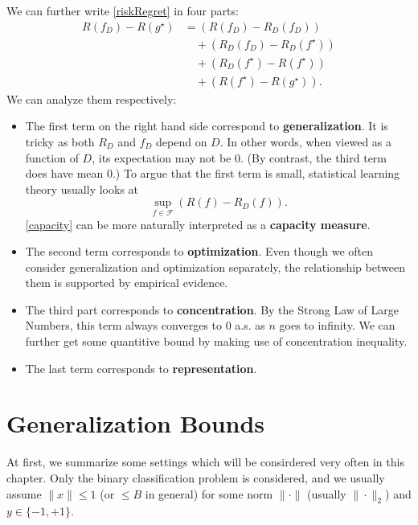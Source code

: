 \documentclass[openany]{book}
\theoremstyle{definition}
\theoremstyle{remark}
\begin{document}
We can further write \eqref{riskRegret} in four parts:
\begin{equation}\label{fullRiskBound}
    \begin{split}
        R(f_{D})-R(g^{\star}) & =\left(R(f_{D})-R_{D}(f_{D})\right) \\
         & \quad+\left(R_{D}(f_{D})-R_{D}(f^{\star})\right) \\
         & \quad+\left(R_{D}(f^{\star})-R(f^{\star})\right) \\
         & \quad+\left(R(f^{\star})-R(g^{\star})\right).
    \end{split}
\end{equation}
We can analyze them respectively:
\begin{itemize}
    \item The first term on the right hand side correspond to \textbf{generalization}. It is tricky as both $R_{D}$ and $f_{D}$ depend on $D$. In other words, when viewed as a function of $D$, its expectation may not be $0$. (By contrast, the third term does have mean 0.) To argue that the first term is small, statistical learning theory usually looks at
    \begin{equation}\label{capacity}
        \sup_{f\in \mathcal{F}}\left(R(f)-R_D(f)\right).
    \end{equation}
    \eqref{capacity} can be more naturally interpreted as a \textbf{capacity measure}.

    \item The second term corresponds to \textbf{optimization}. Even though we often consider generalization and optimization separately, the relationship between them is supported by empirical evidence.

    \item The third part corresponds to \textbf{concentration}. By the Strong Law of Large Numbers, this term always converges to $0$ a.s. as $n$ goes to infinity. We can further get some quantitive bound by making use of concentration inequality.

    \item The last term corresponds to \textbf{representation}.
\end{itemize}

\chapter{Generalization Bounds}
At first, we summarize some settings which will be consirdered very often in this chapter. Only the binary classification problem is considered, and we usually assume $\|x\|\le1$ (or $\le B$ in general) for some norm $\|\cdot\|$ (usually $\|\cdot\|_2$) and $y\in\{-1,+1\}$.
\end{document}

